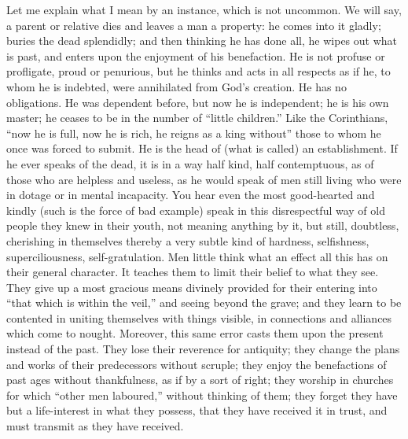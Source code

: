 Let me explain what I mean by an instance, which is not uncommon.
We will say, a parent or relative dies and leaves a man a property: he
comes into it gladly; buries the dead splendidly; and then thinking he
has done all, he wipes out what is past, and enters upon the enjoyment
of his benefaction. He is not profuse or profligate, proud or
penurious, but he thinks and acts in all respects as if he, to whom he
is indebted, were annihilated from God's creation. He has no
obligations. He was dependent before, but now he is independent; he is
his own master; he ceases to be in the number of ``little
children.'' Like the Corinthians, ``now he is full, now he is
rich, he reigns as a king without'' those to whom he once was
forced to submit. He is the head of (what is called) an establishment.
If he ever speaks of the dead, it is in a way half kind, half
contemptuous, as of those who are helpless and useless, as he would
speak of men still living who were in dotage or in mental incapacity.
You hear even the most good-hearted and kindly (such is the force of
bad example) speak in this disrespectful way of old people they knew
in their youth, not meaning anything by it, but still, doubtless,
cherishing in themselves thereby a very subtle kind of hardness,
selfishness, superciliousness, self-gratulation. Men little think what
an effect all this has on their general character. It teaches them to
limit their belief to what they see. They give up a most gracious
means divinely provided for their entering into ``that which is
within the veil,'' and seeing beyond the grave; and they learn to
be contented in uniting themselves with things visible, in connections
and alliances which come to nought. Moreover, this same error casts
them upon the present instead of the past. They lose their reverence
for antiquity; they change the plans and works of their predecessors
without scruple; they enjoy the benefactions of past ages without
thankfulness, as if by a sort of right; they worship in churches for
which ``other men laboured,'' without thinking of them; they
forget they have but a life-interest in what they possess, that they
have received it in trust, and must transmit as they have received.

